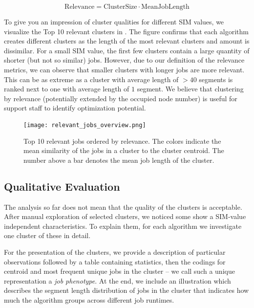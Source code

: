 \documentclass{jhps}
\begin{document}
\begin{equation}
\text{Relevance} = \text{ClusterSize} \cdot \text{MeanJobLength}
\label{eq:rel}
\end{equation}

To give you an impression of cluster qualities for different SIM values, we visualize the Top 10 relevant clusters in .
The figure confirms that each algorithm creates different clusters as the length of the most relevant clusters and amount is dissimilar.
For a small SIM value, the first few clusters contain a large quantity of shorter (but not so similar) jobs.
However, due to our definition of the relevance metrics, we can observe that smaller clusters with longer jobs are more relevant.
This can be as extreme as a cluster with average length of $>40$ segments is ranked next to one with average length of $1$ segment.
We believe that clustering by relevance (potentially extended by the occupied node number) is useful for support staff to identify optimization potential.

\begin{figure}
  \centering
  \texttt{[image: relevant\_jobs\_overview.png]}
   \caption{Top 10 relevant jobs ordered by relevance.
   The colors indicate the mean similarity of the jobs in a cluster to the cluster centroid.
   The number above a bar denotes the mean job length of the cluster.}
   \label{fig:top10_relevant_jobs}
\end{figure}

\subsection{Qualitative Evaluation}
The analysis so far does not mean that the quality of the clusters is acceptable.
After manual exploration of selected clusters, we noticed some show a SIM-value independent characteristics.
To explain them, for each algorithm we investigate one cluster of these in detail.

For the presentation of the clusters, we provide a description of particular observations followed by a table containing statistics, then the codings for centroid and most frequent unique jobs in the cluster -- we call such a unique representation a \textit{job phenotype}.
At the end, we include an illustration which describes the segment length distribution of jobs in the cluster that indicates how much the algorithm groups across different job runtimes.
\end{document}
